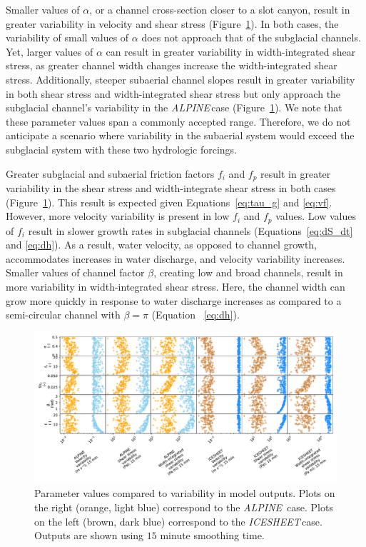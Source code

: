 \documentclass[esurf, manuscript]{copernicus}
\newcommand{\alpine}{\textit{ALPINE}\,}
\newcommand{\icesheet}{\textit{ICESHEET}\,}
\begin{document}
Smaller values of $\alpha$, or a channel cross-section closer to a slot canyon, result in greater variability in velocity and shear stress (Figure~\ref{fig:params}).
In both cases, the variability of small values of $\alpha$ does not approach that of the subglacial channels.
Yet, larger values of $\alpha$ can result in greater variability in width-integrated shear stress, as greater channel width changes increase the width-integrated shear stress.
Additionally, steeper subaerial channel slopes result in greater variability in both shear stress and width-integrated shear stress but only approach the subglacial channel's variability in the \alpine case (Figure~\ref{fig:params}). 
We note that these parameter values span a commonly accepted range.
Therefore, we do not anticipate a scenario where variability in the subaerial system would exceed the subglacial system with these two hydrologic forcings.

Greater subglacial and subaerial friction factors $f_i$ and $f_p$ result in greater variability in the shear stress and width-integrate shear stress in both cases (Figure~\ref{fig:params}).
This result is expected given Equations~\ref{eq:tau_g} and \ref{eq:vf}.
However, more velocity variability is present in low  $f_i$ and $f_p$ values. 
Low values of $f_i$ result in slower growth rates in subglacial channels (Equations~\ref{eq:dS_dt} and \ref{eq:dh}).
As a result, water velocity, as opposed to channel growth, accommodates increases in water discharge, and velocity variability increases.
Smaller values of channel factor $\beta$, creating low and broad channels, result in more variability in width-integrated shear stress.
Here, the channel width can grow more quickly in response to water discharge increases as compared to a semi-circular channel with $\beta = \pi$ (Equation~ \ref{eq:dh}).

\begin{figure}[hbt!]
  \centering
  \includegraphics[width=0.9\linewidth]{Fig4.pdf}
  \caption{Parameter values compared to variability in model outputs.
    Plots on the right (orange, light blue) correspond to the \alpine{} case. Plots on the left (brown, dark blue) correspond to the \icesheet case.
    Outputs are shown using $15$ minute smoothing time. 
  }
  \label{fig:params}
\end{figure}
\end{document}
